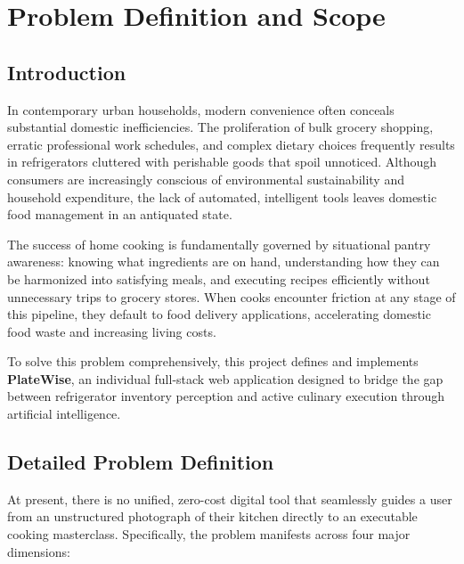 \chapter{Problem Definition and Scope}

\section{Introduction}
In contemporary urban households, modern convenience often conceals substantial domestic inefficiencies. The proliferation of bulk grocery shopping, erratic professional work schedules, and complex dietary choices frequently results in refrigerators cluttered with perishable goods that spoil unnoticed. Although consumers are increasingly conscious of environmental sustainability and household expenditure, the lack of automated, intelligent tools leaves domestic food management in an antiquated state.

The success of home cooking is fundamentally governed by situational pantry awareness: knowing what ingredients are on hand, understanding how they can be harmonized into satisfying meals, and executing recipes efficiently without unnecessary trips to grocery stores. When cooks encounter friction at any stage of this pipeline, they default to food delivery applications, accelerating domestic food waste and increasing living costs.

To solve this problem comprehensively, this project defines and implements \textbf{PlateWise}, an individual full-stack web application designed to bridge the gap between refrigerator inventory perception and active culinary execution through artificial intelligence.

\section{Detailed Problem Definition}
At present, there is no unified, zero-cost digital tool that seamlessly guides a user from an unstructured photograph of their kitchen directly to an executable cooking masterclass. Specifically, the problem manifests across four major dimensions:

